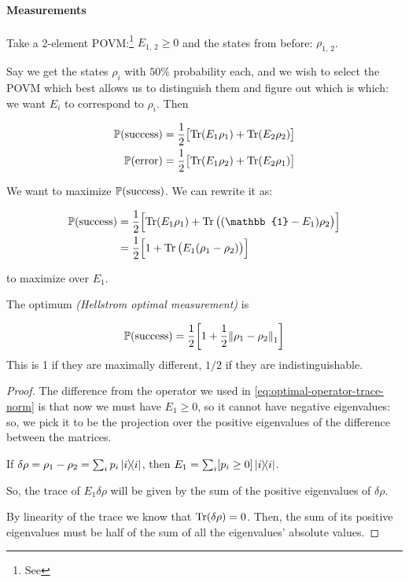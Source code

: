\documentclass[main.tex]{subfiles}
\begin{document}

\paragraph{Measurements}

Take a 2-element POVM:\footnote{See } \(E_{1, \, 2} \geq 0\)
and the states from before: \(\rho_{1, \, 2}\).

Say we get the states \(\rho_i\) with \(50\%\) probability each, and we wish to select the POVM which best allows us to distinguish them and figure out which is which: we want \(E_i\) to correspond to \(\rho_i\). Then

\begin{subequations}
\begin{align}
    \P(\text{success}) &= \frac{1}{2} \qty[\Tr(E_1 \rho_1) + \Tr(E_2 \rho_2)] \\
    \P(\text{error}) &= \frac{1}{2} \qty[\Tr(E_1 \rho_2) + \Tr(E_2 \rho_1)]
\end{align}
\end{subequations}

We want to maximize \(\P(\text{success})\). We can rewrite it as:

\begin{subequations}
\begin{align}
    \P(\text{success}) &= \frac{1}{2} \qty[\Tr(E_1 \rho_1) + \Tr\qty((\mathbb{1} - E_1) \rho_2)] \\
    &= \frac{1}{2}\qty[1 + \Tr \qty(E_1 (\rho_1 - \rho_2))]
\end{align}
\end{subequations}

to maximize over $E_1$.

\begin{claim}
The optimum \emph{(Hellstrom optimal measurement)} is

\begin{equation}
  \P(\mathrm{success}) = \frac{1}{2}\qty[1 + \frac{1}{2} \norm{\rho_1 - \rho_2}_1]
\end{equation}
This is 1 if they are maximally different, $1/2$ if they are indistinguishable.
\end{claim}

\begin{proof}
The difference from the operator we used in \eqref{eq:optimal-operator-trace-norm} is that now we must have \(E_1 \geq 0\), so it cannot have negative eigenvalues:
so, we pick it to be the projection over the positive eigenvalues of the difference between the matrices.

If \(\delta \rho = \rho_1 - \rho_2 = \sum _{i}  p_i \dyad{i}\), then  \(E_1 = \sum _i [p_i \geq 0] \dyad{i}  \).

So, the trace of \(E_1 \delta \rho\) will be given by the sum of the positive eigenvalues of \(\delta \rho\).

By linearity of the trace we know that \(\Tr(\delta \rho) = 0\). Then, the sum of its positive eigenvalues must be half of the sum of all the eigenvalues' absolute values.
\end{proof}
\end{document}
